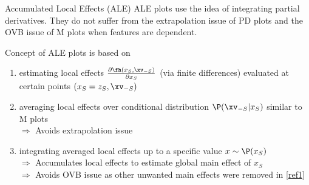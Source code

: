 \documentclass[11pt,compress,t,notes=noshow, aspectratio=169, xcolor=table]{beamer}
\begin{document}
\begin{frame}{Accumulated Local Effects (ALE) }
ALE plots use the idea of integrating partial derivatives. They do not suffer from the extrapolation issue of PD plots and the OVB issue of M plots when features are dependent.

\lz
Concept of ALE plots is based on
\begin{enumerate}[<+->]
\item estimating local effects $\frac{\partial \fh(x_S, \xv_{-S})}{\partial x_S}$ (via finite differences) evaluated at certain points $(x_S = z_S, \xv_{-S})$\label{ref1}
\item averaging local effects over conditional distribution $\P(\xv_{-S}|x_S)$ similar to M plots\\ %
$\Rightarrow$ Avoids extrapolation issue\label{ref2}
\item integrating averaged local effects up to a specific value $x \sim \P(x_S)$\\ %
$\Rightarrow$ Accumulates local effects to estimate global main effect of $x_S$\\
$\Rightarrow$ Avoids OVB issue as other unwanted main effects were removed in \eqref{ref1} \label{ref3}
\end{enumerate}

\end{frame}
\end{document}
